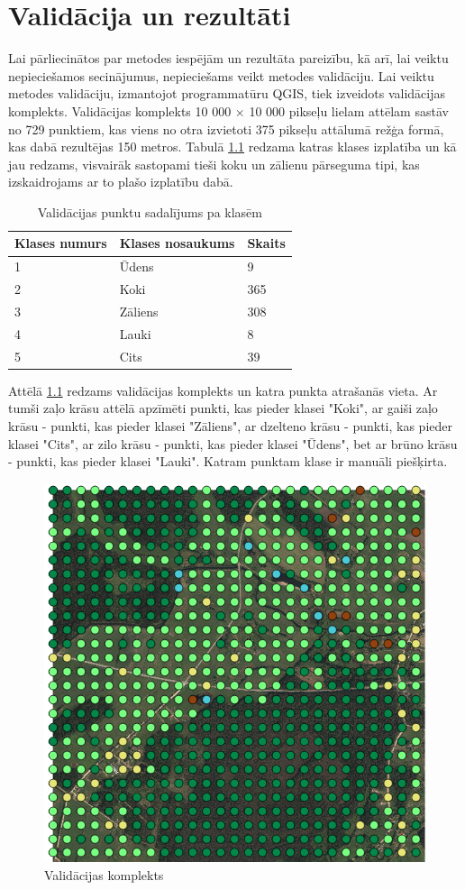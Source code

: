 \documentclass[12pt,paper=a4]{report}
\begin{document}
\chapter{Validācija un rezultāti}Lai pārliecinātos par metodes iespējām un rezultāta pareizību, kā arī, lai veiktu nepieciešamos secinājumus, nepieciešams veikt metodes validāciju. Lai veiktu metodes validāciju, izmantojot programmatūru QGIS, tiek izveidots validācijas komplekts. Validācijas komplekts 10 000 $\times$ 10 000 pikseļu  lielam attēlam sastāv no 729 punktiem, kas viens no otra izvietoti 375 pikseļu attālumā režģa formā, kas dabā rezultējas 150 metros. Tabulā \ref{tab:valPunkti} redzama katras klases izplatība un kā jau redzams, visvairāk sastopami tieši koku un zālienu pārseguma tipi, kas izskaidrojams ar to plašo izplatību dabā.
\begin{table}[!ht]
\centering
\caption{Validācijas punktu sadalījums pa klasēm}
\label{tab:valPunkti}
\begin{tabular}{|l|l|l|}
\hline
Klases numurs&Klases nosaukums& Skaits\\ \hline \hline
1&Ūdens&9 \\ \hline
2&Koki & 365\\ \hline
3&Zāliens & 308\\ \hline
4&Lauki & 8\\ \hline
5&Cits & 39\\ \hline
\end{tabular}
\end{table}\par
Attēlā \ref{fig:validacija} redzams validācijas komplekts un katra punkta atrašanās vieta. Ar tumši zaļo krāsu attēlā apzīmēti punkti, kas pieder klasei "Koki", ar gaiši zaļo krāsu - punkti, kas pieder klasei "Zāliens", ar dzelteno krāsu - punkti, kas pieder klasei "Cits", ar zilo krāsu - punkti, kas pieder klasei "Ūdens", bet ar brūno krāsu - punkti, kas pieder klasei "Lauki". Katram punktam klase ir manuāli piešķirta.
\begin{figure}[h!]
\centering
\includegraphics[width=.5\textwidth]{validacija}
\caption{Validācijas komplekts}
\label{fig:validacija}
\end{figure}\par
\end{document}
